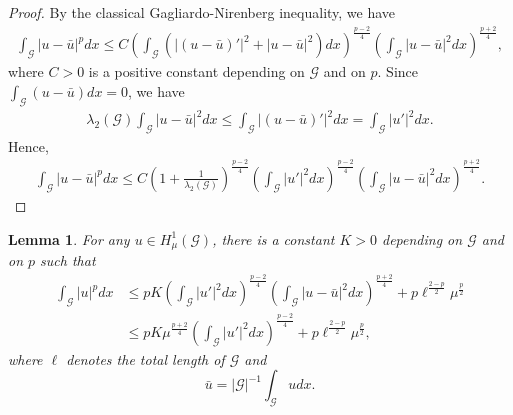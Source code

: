 \documentclass[10pt,a4paper]{article}
\newtheorem{lemma}[theorem]{Lemma}
\theoremstyle{definition} \theoremstyle{remark}
\numberwithin{equation}{section}
\newcommand{\G}{\mathcal{G}}
\newcommand{\la}{\lambda}
\begin{document}
\begin{proof}
	 By the classical Gagliardo-Nirenberg inequality, we have
	\begin{align*}
		\int_\G|u-\bar u|^pdx \leq C\left( \int_\G(|(u-\bar u)'|^2 + |u-\bar u|^2)dx\right)^{\frac{p-2}4}\left( \int_\G|u-\bar{u}|^2dx\right)^{\frac{p+2}4},
	\end{align*}
    where $C > 0$ is a positive constant depending on $\G$ and on $p$. Since $\int_\G(u-\bar u)dx = 0$, we have
    \begin{align*}
    	\la_2(\G)\int_\G|u-\bar u|^2dx \leq \int_\G|(u-\bar u)'|^2dx = \int_\G|u'|^2dx.
    \end{align*}
    Hence,
    \begin{align*}
    	\int_\G|u-\bar u|^pdx \leq C\left( 1 + \frac1{\la_2(\G)} \right)^{\frac{p-2}4} \left( \int_\G|u'|^2dx\right)^{\frac{p-2}4}\left( \int_\G|u-\bar{u}|^2dx\right)^{\frac{p+2}4}.
    \end{align*}
\end{proof}

\begin{lemma} \label{lemgn}
	For any $u \in H_\mu^1(\G)$, there is a constant $K > 0$ depending on $\G$ and on $p$ such that
	\begin{align}
		\int_\G|u|^pdx & \leq pK\left( \int_\G|u'|^2dx\right)^{\frac{p-2}4}\left( \int_\G|u-\bar{u}|^2dx\right)^{\frac{p+2}4} + p\ell^{\frac{2-p}2}\mu^\frac p2 \label{eqgn1} \\
		& \leq pK\mu^{\frac{p+2}4}\left( \int_\G|u'|^2dx\right)^{\frac{p-2}4} + p\ell^{\frac{2-p}2}\mu^\frac p2, \label{ajout1}
	\end{align}
where $\ell$ denotes the total length of $\G$ and
$$
\bar{u} = |\G|^{-1}\int_\G udx.
$$
\end{lemma}
\end{document}
